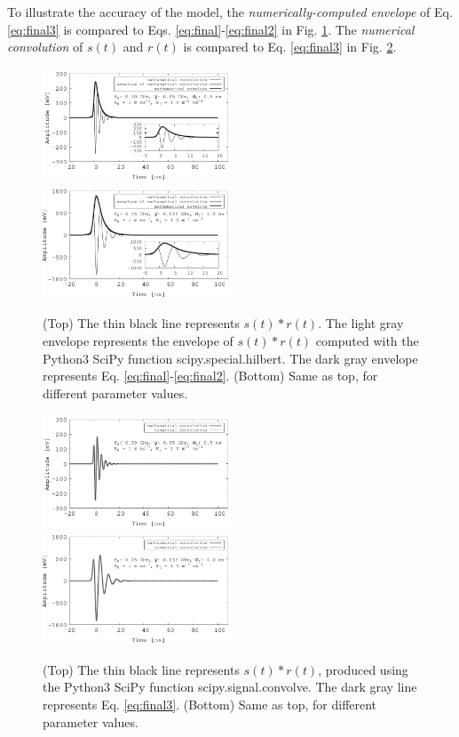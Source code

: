 \documentclass[amsmath,amssymb,aps,prd,10pt,twocolumn,showkeys]{revtex4}
\begin{document}
To illustrate the accuracy of the model, the \textit{numerically-computed envelope} of Eq. \ref{eq:final3} is compared to Eqs. \ref{eq:final}-\ref{eq:final2} in Fig. \ref{fig:fig1}.  The \textit{numerical convolution} of $s(t)$ and $r(t)$ is compared to Eq. \ref{eq:final3} in Fig. \ref{fig:fig2}.
\begin{figure}[ht]
\centering
\includegraphics[width=0.5\textwidth]{July3rd_plot1.pdf}
\includegraphics[width=0.5\textwidth]{July3rd_plot2.pdf}
\caption{\label{fig:fig1} (Top) The thin black line represents $s(t) * r(t)$.  The light gray envelope represents the envelope of $s(t) * r(t)$ computed with the Python3 SciPy function scipy.special.hilbert. The dark gray envelope represents Eq. \ref{eq:final}-\ref{eq:final2}. (Bottom) Same as top, for different parameter values.}
\end{figure}
\begin{figure}[ht]
\centering
\includegraphics[width=0.5\textwidth]{July7th_plot1.pdf}
\includegraphics[width=0.5\textwidth]{July7th_plot2.pdf}
\caption{\label{fig:fig2} (Top) The thin black line represents $s(t) * r(t)$, produced using the Python3 SciPy function scipy.signal.convolve. The dark gray line represents Eq. \ref{eq:final3}. (Bottom) Same as top, for different parameter values.}
\end{figure}
\end{document}
